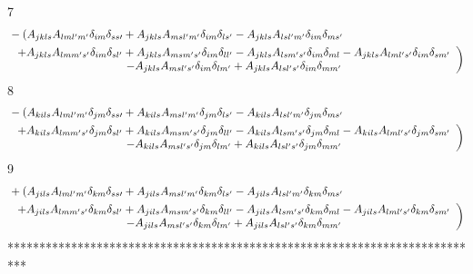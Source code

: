 \documentclass[aps,preprint]{revtex4}%
\begin{document}
7%
\begin{align}
&  -\left(  A_{jkls}A_{lml^{\prime}m^{\prime}}\delta_{im}\delta_{ss\prime
}+A_{jkls}A_{msl^{\prime}m^{\prime}}\delta_{im}\delta_{ls^{\prime}}%
-A_{jkls}A_{lsl^{\prime}m^{\prime}}\delta_{im}\delta_{ms^{\prime}}\right. \\
&  \left.
\begin{array}
[c]{c}%
+A_{jkls}A_{lmm^{\prime}s^{\prime}}\delta_{im}\delta_{sl^{\prime}}%
+A_{jkls}A_{msm^{\prime}s^{\prime}}\delta_{im}\delta_{ll^{\prime}}%
-A_{jkls}A_{lsm^{\prime}s^{\prime}}\delta_{im}\delta_{ml}-A_{jkls}%
A_{lml^{\prime}s^{\prime}}\delta_{im}\delta_{sm^{\prime}}\\
-A_{jkls}A_{msl^{\prime}s^{\prime}}\delta_{im}\delta_{lm^{\prime}}%
+A_{jkls}A_{lsl^{\prime}s^{\prime}}\delta_{im}\delta_{mm^{\prime}}%
\end{array}
\right)
\end{align}
8%
\begin{align}
&  -\left(  A_{kils}A_{lml^{\prime}m^{\prime}}\delta_{jm}\delta_{ss\prime
}+A_{kils}A_{msl^{\prime}m^{\prime}}\delta_{jm}\delta_{ls^{\prime}}%
-A_{kils}A_{lsl^{\prime}m^{\prime}}\delta_{jm}\delta_{ms^{\prime}}\right. \\
&  \left.
\begin{array}
[c]{c}%
+A_{kils}A_{lmm^{\prime}s^{\prime}}\delta_{jm}\delta_{sl^{\prime}}%
+A_{kils}A_{msm^{\prime}s^{\prime}}\delta_{jm}\delta_{ll^{\prime}}%
-A_{kils}A_{lsm^{\prime}s^{\prime}}\delta_{jm}\delta_{ml}-A_{kils}%
A_{lml^{\prime}s^{\prime}}\delta_{jm}\delta_{sm^{\prime}}\\
-A_{kils}A_{msl^{\prime}s^{\prime}}\delta_{jm}\delta_{lm^{\prime}}%
+A_{kils}A_{lsl^{\prime}s^{\prime}}\delta_{jm}\delta_{mm^{\prime}}%
\end{array}
\right)
\end{align}
9%
\begin{align}
&  +\left(  A_{jils}A_{lml^{\prime}m^{\prime}}\delta_{km}\delta_{ss\prime
}+A_{jils}A_{msl^{\prime}m^{\prime}}\delta_{km}\delta_{ls^{\prime}}%
-A_{jils}A_{lsl^{\prime}m^{\prime}}\delta_{km}\delta_{ms^{\prime}}\right. \\
&  \left.
\begin{array}
[c]{c}%
+A_{jils}A_{lmm^{\prime}s^{\prime}}\delta_{km}\delta_{sl^{\prime}}%
+A_{jils}A_{msm^{\prime}s^{\prime}}\delta_{km}\delta_{ll^{\prime}}%
-A_{jils}A_{lsm^{\prime}s^{\prime}}\delta_{km}\delta_{ml}-A_{jils}%
A_{lml^{\prime}s^{\prime}}\delta_{km}\delta_{sm^{\prime}}\\
-A_{jils}A_{msl^{\prime}s^{\prime}}\delta_{km}\delta_{lm^{\prime}}%
+A_{jils}A_{lsl^{\prime}s^{\prime}}\delta_{km}\delta_{mm^{\prime}}%
\end{array}
\right)
\end{align}
***************************************************************************
\end{document}

